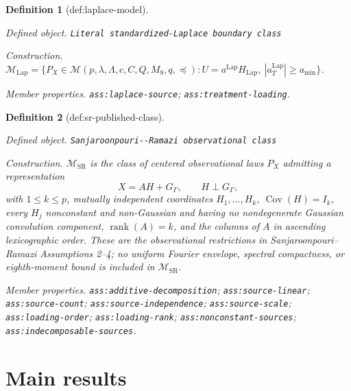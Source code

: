\documentclass{article}
\newtheorem{definition}{Definition}
\begin{document}
\begin{definition}[def:laplace-model]\label{def:laplace-model}
\par\smallskip\noindent\emph{Defined object.} \texttt{Literal standardized-\allowbreak{}Laplace boundary class}
\par\smallskip\noindent\emph{Construction.} \(\mathcal M_{\mathrm{Lap}}=\{P_X\in\mathcal M(p,\lambda,\Lambda,c,C,Q,M_8,q,\preceq):U=a^{\mathrm{Lap}}H_{\mathrm{Lap}},\ |a_T^{\mathrm{Lap}}|\ge a_{\min}\}\).
\par\smallskip\noindent\emph{Member properties.} \texttt{ass:\allowbreak{}laplace-\allowbreak{}source}; \texttt{ass:\allowbreak{}treatment-\allowbreak{}loading}.
\end{definition}

\begin{definition}[def:sr-published-class]\label{def:sr-published-class}
\par\smallskip\noindent\emph{Defined object.} \texttt{Sanjaroonpouri-\allowbreak{}-\allowbreak{}Ramazi observational class}
\par\smallskip\noindent\emph{Construction.} \(\mathcal M_{\mathrm{SR}}\) is the class of centered observational laws \(P_X\) admitting a representation
\[
 X=AH+G_\Gamma,\qquad H\perp G_\Gamma,
\]
with \(1\le k\le p\), mutually independent coordinates \(H_1,\ldots,H_k\), \(\operatorname{Cov}(H)=I_k\), every \(H_j\) nonconstant and non-Gaussian and having no nondegenerate Gaussian convolution component, \(\operatorname{rank}(A)=k\), and the columns of \(A\) in ascending lexicographic order.  These are the observational restrictions in Sanjaroonpouri--Ramazi Assumptions 2--4; no uniform Fourier envelope, spectral compactness, or eighth-moment bound is included in \(\mathcal M_{\mathrm{SR}}\).
\par\smallskip\noindent\emph{Member properties.} \texttt{ass:\allowbreak{}additive-\allowbreak{}decomposition}; \texttt{ass:\allowbreak{}source-\allowbreak{}linear}; \texttt{ass:\allowbreak{}source-\allowbreak{}count}; \texttt{ass:\allowbreak{}source-\allowbreak{}independence}; \texttt{ass:\allowbreak{}source-\allowbreak{}scale}; \texttt{ass:\allowbreak{}loading-\allowbreak{}order}; \texttt{ass:\allowbreak{}loading-\allowbreak{}rank}; \texttt{ass:\allowbreak{}nonconstant-\allowbreak{}sources}; \texttt{ass:\allowbreak{}indecomposable-\allowbreak{}sources}.
\end{definition}

\section{Main results}
\end{document}
